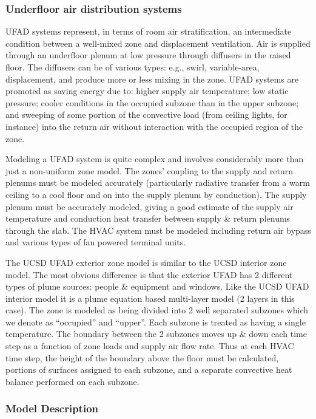 \subsubsection{Underfloor air distribution systems}\label{underfloor-air-distribution-systems-1}

UFAD systems represent, in terms of room air stratification, an intermediate condition between a well-mixed zone and displacement ventilation. Air is supplied through an underfloor plenum at low pressure through diffusers in the raised floor. The diffusers can be of various types: e.g., swirl, variable-area, displacement, and produce more or less mixing in the zone. UFAD systems are promoted as saving energy due to: higher supply air temperature; low static pressure; cooler conditions in the occupied subzone than in the upper subzone; and sweeping of some portion of the convective load (from ceiling lights, for instance) into the return air without interaction with the occupied region of the zone.

Modeling a UFAD system is quite complex and involves considerably more than just a non-uniform zone model. The zones' coupling to the supply and return plenums must be modeled accurately (particularly radiative transfer from a warm ceiling to a cool floor and on into the supply plenum by conduction). The supply plenum must be accurately modeled, giving a good estimate of the supply air temperature and conduction heat transfer between supply \& return plenums through the slab. The HVAC system must be modeled including return air bypass and various types of fan powered terminal units.

The UCSD UFAD exterior zone model is similar to the UCSD interior zone model. The most obvious difference is that the exterior UFAD has 2 different types of plume sources: people \& equipment and windows. Like the UCSD UFAD interior model it is a plume equation based multi-layer model (2 layers in this case). The zone is modeled as being divided into 2 well separated subzones which we denote as ``occupied'' and ``upper''. Each subzone is treated as having a single temperature. The boundary between the 2 subzones moves up \& down each time step as a function of zone loads and supply air flow rate. Thus at each HVAC time step, the height of the boundary above the floor must be calculated, portions of surfaces assigned to each subzone, and a separate convective heat balance performed on each subzone.

\subsubsection{Model Description}\label{model-description-2-001}

